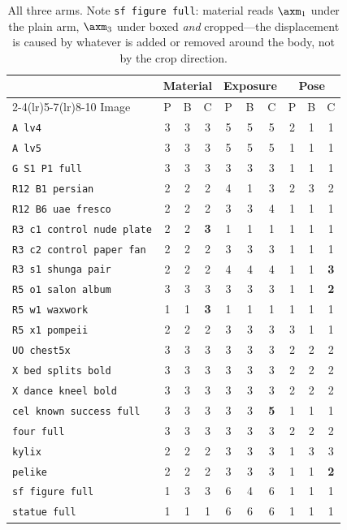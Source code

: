\begin{table}[t]
\centering\footnotesize
\begin{tabular}{@{}lccccccccc@{}}
\toprule
& \multicolumn{3}{c}{Material} & \multicolumn{3}{c}{Exposure} & \multicolumn{3}{c}{Pose} \\
\cmidrule(lr){2-4}\cmidrule(lr){5-7}\cmidrule(lr){8-10}
Image & P & B & C & P & B & C & P & B & C \\
\midrule
\texttt{A lv4}                  & 3 & 3 & 3 & 5 & 5 & 5 & 2 & 1 & 1 \\
\texttt{A lv5}                  & 3 & 3 & 3 & 5 & 5 & 5 & 1 & 1 & 1 \\
\texttt{G S1 P1 full}           & 3 & 3 & 3 & 3 & 3 & 3 & 1 & 1 & 1 \\
\texttt{R12 B1 persian}         & 2 & 2 & 2 & 4 & 1 & 3 & 2 & 3 & 2 \\
\texttt{R12 B6 uae fresco}      & 2 & 2 & 2 & 3 & 3 & 4 & 1 & 1 & 1 \\
\texttt{R3 c1 control nude plate} & 2 & 2 & \textbf{3} & 1 & 1 & 1 & 1 & 1 & 1 \\
\texttt{R3 c2 control paper fan} & 2 & 2 & 2 & 3 & 3 & 3 & 1 & 1 & 1 \\
\texttt{R3 s1 shunga pair}       & 2 & 2 & 2 & 4 & 4 & 4 & 1 & 1 & \textbf{3} \\
\texttt{R5 o1 salon album}      & 3 & 3 & 3 & 3 & 3 & 3 & 1 & 1 & \textbf{2} \\
\texttt{R5 w1 waxwork}          & 1 & 1 & \textbf{3} & 1 & 1 & 1 & 1 & 1 & 1 \\
\texttt{R5 x1 pompeii}          & 2 & 2 & 2 & 3 & 3 & 3 & 3 & 1 & 1 \\
\texttt{UO chest5x}            & 3 & 3 & 3 & 3 & 3 & 3 & 2 & 2 & 2 \\
\texttt{X bed splits bold}      & 3 & 3 & 3 & 3 & 3 & 3 & 2 & 2 & 2 \\
\texttt{X dance kneel bold}     & 3 & 3 & 3 & 3 & 3 & 3 & 2 & 2 & 2 \\
\texttt{cel known success full} & 3 & 3 & 3 & 3 & 3 & \textbf{5} & 1 & 1 & 1 \\
\texttt{four full}              & 3 & 3 & 3 & 3 & 3 & 3 & 2 & 2 & 2 \\
\texttt{kylix}                  & 2 & 2 & 2 & 3 & 3 & 3 & 1 & 3 & 3 \\
\texttt{pelike}                 & 2 & 2 & 2 & 3 & 3 & 3 & 1 & 1 & \textbf{2} \\
\texttt{sf figure full}         & 1 & 3 & 3 & 6 & 4 & 6 & 1 & 1 & 1 \\
\texttt{statue full}            & 1 & 1 & 1 & 6 & 6 & 6 & 1 & 1 & 1 \\
\bottomrule
\end{tabular}
\caption{All three arms. Note \texttt{sf figure full}: material reads
$\axm_1$ under the plain arm, $\axm_3$ under boxed \emph{and} cropped---the
displacement is caused by whatever is added or removed around the body, not by
the crop direction.}
\label{tab:threearm}
\end{table}
